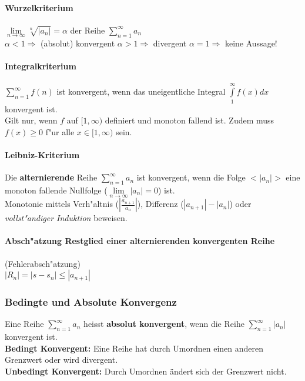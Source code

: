 \paragraph{Wurzelkriterium}
  $ \lim\limits_{n \to \infty} \sqrt[n]{\left|a_n\right|} = \alpha $ der Reihe $
\sum\limits_{n=1}^{\infty} a_n $ \\ $\alpha < 1 \Rightarrow$ (absolut) konvergent\hspace{3cm}
  $\alpha > 1 \Rightarrow$ divergent \hspace{4cm} 
  $\alpha = 1 \Rightarrow$ keine Aussage!

\paragraph{Integralkriterium}
  $ \sum\limits_{n=1}^{\infty} f(n) $ ist konvergent, wenn das uneigentliche
Integral $ \int\limits_{1}^{\infty} f(x) dx $ konvergent ist. \\ Gilt nur, wenn $f$ auf $ [1, \infty) $ definiert und monoton fallend ist. Zudem muss $ f(x) \geq 0 $ f"ur alle $x \in [1, \infty)$ sein.
 
\paragraph{Leibniz-Kriterium}
  Die \textbf{alternierende} Reihe $ \sum\limits_{n=1}^{\infty} a_n $ ist
  konvergent, wenn die Folge $<\left|a_n\right|>$ eine monoton fallende Nullfolge ($\lim\limits_{n \to \infty} \left|a_n\right| = 0 $) ist. \\ 
  Monotonie mittels Verh"altnis ($ \left|\frac{a_{n+1}}{a_n}\right| $),
  Differenz ($ |a_{n+1}| - |a_n| $) oder \textit{vollst"andiger Induktion} beweisen.\\

\paragraph{Absch"atzung Restglied einer alternierenden konvergenten
  Reihe} (Fehlerabsch"atzung)\\
  $|R_n| = |s-s_n|\leq  |a_{n+1}|$


\subsubsection{Bedingte und Absolute Konvergenz}
  Eine Reihe $\sum\limits_{n=1}^{\infty}a_n$ heisst \textbf{absolut konvergent},
wenn die Reihe $\sum\limits_{n=1}^{\infty}|a_n|$ konvergent ist.\\
\textbf{Bedingt Konvergent:} Eine Reihe hat durch Umordnen einen anderen
Grenzwert oder wird divergent.\\
\textbf{Unbedingt Konvergent:} Durch Umordnen \"andert sich der Grenzwert nicht.

